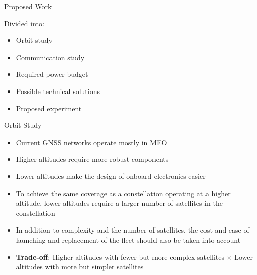 %
%
%
%
%

%
%
%
%
%

\begin{frame}{Proposed Work}

    Divided into:
    \begin{itemize}
        \item Orbit study
        \vspace{0.1cm}
        \item Communication study
        \vspace{0.1cm}
        \item Required power budget
        \vspace{0.1cm}
        \item Possible technical solutions
        \vspace{0.1cm}
        \item Proposed experiment
    \end{itemize}

\end{frame}

\begin{frame}{Orbit Study}

    \begin{itemize}
        \item Current GNSS networks operate mostly in MEO
        \vspace{0.1cm}
        \item Higher altitudes require more robust components
        \vspace{0.1cm}
        \item Lower altitudes make the design of onboard electronics easier
        \vspace{0.1cm}
        \item To achieve the same coverage as a constellation operating at a higher altitude, lower altitudes require a larger number of satellites in the constellation
        \vspace{0.1cm}
        \item In addition to complexity and the number of satellites, the cost and ease of launching and replacement of the fleet should also be taken into account
        \vspace{0.1cm}
        \item \textbf{Trade-off}: Higher altitudes with fewer but more complex satellites $\times$ Lower altitudes with more but simpler satellites
    \end{itemize}

\end{frame}

